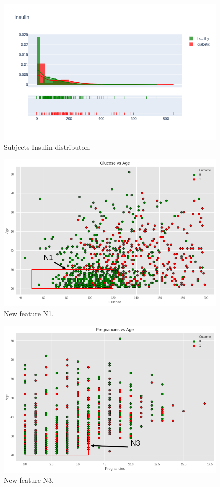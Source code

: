\documentclass[12pt]{article}
\begin{document}
\begin{figure}[ht]
\centering
\includegraphics[width=1\textwidth]{6.png}
\caption{\label{fig:14} Subjects Insulin distributon.}
\end{figure}

\begin{figure}[ht]
\centering
\includegraphics[width=1\textwidth]{download(1).png}
\caption{\label{fig:18} New feature N1.}
\end{figure}

\begin{figure}[ht]
\centering
\includegraphics[width=1\textwidth]{download(2).png}
\caption{\label{fig:19} New feature N3.}
\end{figure}
\end{document}
